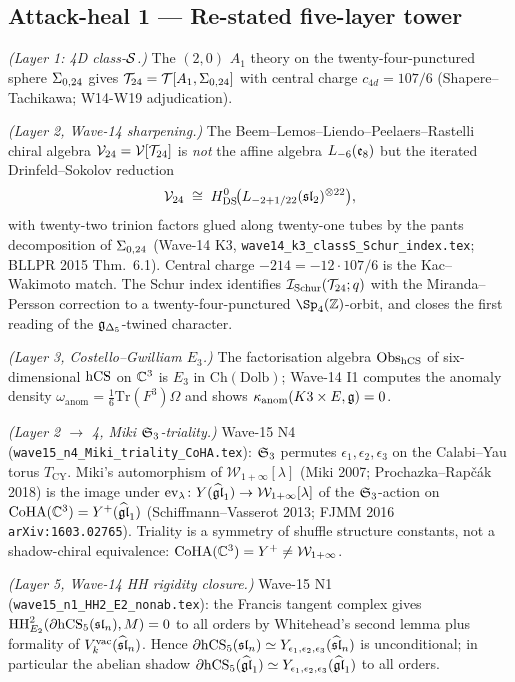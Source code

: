 \subsection*{Attack-heal 1 --- Re-stated five-layer tower}

\ClaimStatusTheorem{} \emph{(Layer 1: 4D class-$\mathcal{S}$.)} The
$(2,0)$ $A_1$ theory on the twenty-four-punctured sphere
$\Sigma_{0,24}$ gives $\mathcal{T}_{24}=\mathcal{T}[A_1,\Sigma_{0,24}]$ with central charge
$c_{4d}=107/6$ (Shapere--Tachikawa; W14-W19 adjudication).

\ClaimStatusTheorem{} \emph{(Layer 2, Wave-14 sharpening.)} The
Beem--Lemos--Liendo--Peelaers--Rastelli chiral algebra
$\mathcal{V}_{24}=\mathcal{V}[\mathcal{T}_{24}]$ is \emph{not} the affine algebra
$L_{-6}(\mathfrak{e}_8)$ but the iterated Drinfeld--Sokolov reduction
\[
  \mathcal{V}_{24}\;\cong\;
  H^{0}_{\mathrm{DS}}\!\bigl(L_{-2+1/22}(\mathfrak{sl}_2)^{\otimes 22}\bigr),
\]
with twenty-two trinion factors glued along twenty-one tubes by the
pants decomposition of $\Sigma_{0,24}$
(Wave-14 K3, \texttt{wave14\_k3\_classS\_Schur\_index.tex};
BLLPR 2015 Thm.~6.1).  Central charge $-214=-12\cdot 107/6$ is the
Kac--Wakimoto match.  The Schur index identifies
$\mathcal{I}_{\mathrm{Schur}}(\mathcal{T}_{24};q)$ with the Miranda--Persson
correction to a twenty-four-punctured $\Sp_4(\Z)$-orbit, and closes
the first reading of the $\mathfrak{g}_{\Delta_5}$-twined character.

\ClaimStatusTheorem{} \emph{(Layer 3, Costello--Gwilliam $E_3$.)} The
factorisation algebra $\mathrm{Obs}_{\mathrm{hCS}}$ of six-dimensional $\mathrm{hCS}$ on
$\mathbb{C}^3$ is $E_3$ in $\mathrm{Ch}(\mathrm{Dolb})$; Wave-14 I1 computes
the anomaly density $\omega_{\mathrm{anom}}=\tfrac16\mathrm{Tr}(F^3)\Omega$
and shows $\kappa_{\mathrm{anom}}(K3\times E,\mathfrak{g})=0$.

\ClaimStatusTheorem{} \emph{(Layer 2 $\to$ 4, Miki $\mathfrak{S}_{3}$-triality.)}
Wave-15 N4 (\texttt{wave15\_n4\_Miki\_triality\_CoHA.tex}):
$\mathfrak{S}_{3}$ permutes $\epsilon_1,\epsilon_2,\epsilon_3$ on the
Calabi--Yau torus $T_{\mathrm{CY}}$.  Miki's automorphism of
$\mathcal{W}_{1+\infty}[\lambda]$ (Miki 2007; Prochazka--Rap{\v c}{\'a}k
2018) is the image under $\mathrm{ev}_\lambda\colon Y(\widehat{\mathfrak{gl}}_1)\to
\mathcal{W}_{1+\infty}[\lambda]$ of the $\mathfrak{S}_{3}$-action on
$\mathrm{CoHA}(\mathbb{C}^3)=Y^+(\widehat{\mathfrak{gl}}_1)$ (Schiffmann--Vasserot 2013; FJMM 2016
\texttt{arXiv:1603.02765}).  Triality is a symmetry of shuffle
structure constants, not a shadow-chiral equivalence:
$\mathrm{CoHA}(\mathbb{C}^3)=Y^+\ne\mathcal{W}_{1+\infty}$.

\ClaimStatusTheorem{} \emph{(Layer 5, Wave-14 HH rigidity closure.)}
Wave-15 N1 (\texttt{wave15\_n1\_HH2\_E2\_nonab.tex}): the Francis
tangent complex gives
$\mathrm{HH}^2_{E_2}(\partial\mathrm{hCS}_5(\mathfrak{sl}_n),M)=0$ to all orders by
Whitehead's second lemma plus formality of
$V^{\mathrm{vac}}_k(\widehat{\mathfrak{sl}}_n)$.  Hence
$\partial\mathrm{hCS}_5(\mathfrak{sl}_n)\simeq Y_{\epsilon_1,\epsilon_2,\epsilon_3}(\widehat{\mathfrak{sl}}_n)$ is
unconditional; in particular the abelian shadow
$\partial\mathrm{hCS}_5(\widehat{\mathfrak{gl}}_1)\simeq Y_{\epsilon_1,\epsilon_2,\epsilon_3}(\widehat{\mathfrak{gl}}_1)$ to all orders.

